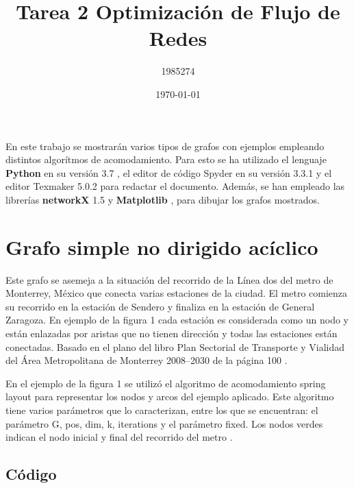 \documentclass{article}
\begin{document}
\title{Tarea 2 Optimización de Flujo de Redes}
\author{1985274}
\date{\today}
\maketitle 

\maketitle

En este trabajo se mostrarán varios tipos de grafos con ejemplos empleando distintos algorítmos de acomodamiento. Para esto se ha utilizado el lenguaje \textbf{Python} en su versión 3.7 \cite{python},  el editor de código Spyder en su versión 3.3.1 y el editor Texmaker 5.0.2 para redactar el documento. Además, se han empleado las librerías \textbf{networkX} 1.5  \cite{networkx} y \textbf{Matplotlib}  \cite{matplotlib}, para dibujar los grafos mostrados. 

\section{Grafo simple no dirigido acíclico}  

Este grafo se asemeja a la situación del recorrido de la Línea dos del metro de Monterrey, México que conecta varias estaciones de la ciudad. El metro comienza su recorrido en la estación de Sendero y finaliza en la estación de General Zaragoza. En ejemplo de la figura 1 cada estación es considerada como un nodo y están enlazadas por aristas que no tienen dirección y todas las estaciones están conectadas. Basado en el plano del libro Plan Sectorial de Transporte y Vialidad del Área Metropolitana de Monterrey 2008--2030 de la página 100 \cite{agenciadetransporte}. 

En el ejemplo de la figura 1 se utilizó el algoritmo de acomodamiento spring layout para representar los nodos y arcos del ejemplo aplicado. Este algoritmo tiene varios parámetros que lo caracterizan, entre los que se encuentran: el parámetro G, pos, dim, k, iterations y el parámetro fixed. Los nodos verdes indican el nodo inicial y final del recorrido del metro \cite{ejemnetworkx1} . 

\subsection{Código}


\end{document}
